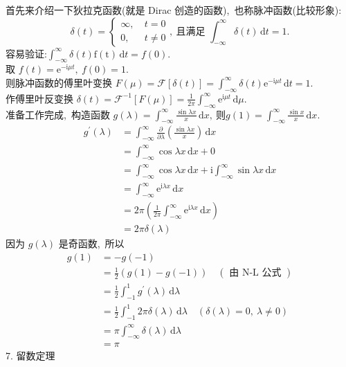 \begin{solution}
		首先来介绍一下狄拉克函数(就是 Dirac 创造的函数),\  也称脉冲函数(比较形象):
		$$\delta(t)=\left\{\begin{array}{ll}
			\infty,\  & t=0 \\
			0,\  & t \neq 0
		\end{array},\ \text {且满足 } \int_{-\infty}^{\infty} \delta(t) \,\mathrm{d}t=1 .\right.$$
		容易验证:$  \int_{-\infty}^{\infty} \delta(t) \mathrm{f}(\mathrm{t}) \,\mathrm{d}t=f(0) .$\\
		取  $f(t)=\mathrm{e}^{-\mathrm{i} \mu t},\  f(0)=1 .$\\
		则脉冲函数的傅里叶变换  $F(\mu)=\mathscr{F}[\delta(t)]=\int_{-\infty}^{\infty} \delta(t) \mathrm{e}^{-\mathrm{i} \mu t} \,\mathrm{d}t=1 .$\\
		作傅里叶反变换  $\delta(t)=\mathscr{F}^{-1}[F(\mu)]=\frac{1}{2 \pi} \int_{-\infty}^{\infty} \mathrm{e}^{\mathrm{i} \mu t}\,\mathrm{d}\mu .$\\
		准备工作完成,\  构造函数 $ g(\lambda)=\int_{-\infty}^{\infty} \frac{\sin \lambda x}{x} \,\mathrm{d}x ,\  则  g(1)=\int_{-\infty}^{\infty} \frac{\sin x}{x} \,\mathrm{d}x .$\\
		$$\begin{aligned}
			g^{\prime}(\lambda) & =\int_{-\infty}^{\infty} \frac{\partial}{\partial \lambda}\left(\frac{\sin \lambda x}{x}\right)\,\mathrm{d}x\\
			& =\int_{-\infty}^{\infty} \cos \lambda x\,\mathrm{d}x+0 \\
			& =\int_{-\infty}^{\infty} \cos \lambda x\,\mathrm{d}x+\mathrm{i} \int_{-\infty}^{\infty} \sin \lambda x\,\mathrm{d}x \\
			& =\int_{-\infty}^{\infty} \mathrm{e}^{\mathrm{i} \lambda x} \,\mathrm{d}x \\
			& =2 \pi\left(\frac{1}{2 \pi} \int_{-\infty}^{\infty} \mathrm{e}^{\mathrm{i} \lambda x} \,\mathrm{d}x\right) \\
			& =2 \pi \delta(\lambda)
		\end{aligned}$$
		因为  $g(\lambda)$  是奇函数,\  所以
		$$\begin{aligned}
			g(1) & =-g(-1) \\
			& =\frac{1}{2}(g(1)-g(-1)) \quad(\text { 由 N-L 公式 }) \\
			& =\frac{1}{2} \int_{-1}^{1} g^{\prime}(\lambda)\,\mathrm{d} \lambda \\
			& =\frac{1}{2} \int_{-1}^{1} 2 \pi \delta(\lambda)\,\mathrm{d} \lambda \quad(\delta(\lambda)=0,\  \lambda \neq 0) \\
			& =\pi \int_{-\infty}^{\infty} \delta(\lambda)\,\mathrm{d}\lambda \\
			& =\pi
		\end{aligned}$$
		7. 留数定理
		

\end{solution}
